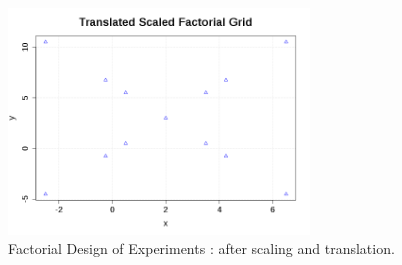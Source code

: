              \begin{figure}[H]
               \begin{center}
                 \includegraphics[width=8cm]{Figures/TranslatedScaledFactorialGrid.png}
               \end{center}
               \caption{Factorial Design of Experiments  : after scaling and translation.}
               \label{TranslatedScaledFactorialGrid}
             \end{figure}





